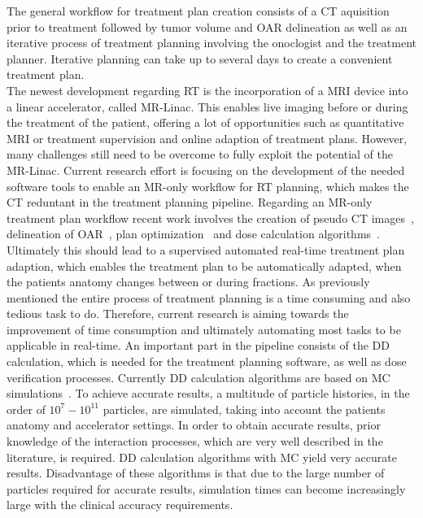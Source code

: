The general workflow for treatment plan creation consists of a \ac{CT} aquisition prior to treatment followed by tumor volume and \acs{OAR} delineation as well as an iterative process of treatment planning involving the onoclogist and the treatment planner. 
Iterative planning can take up to several days to create a convenient treatment plan.\\
The newest development regarding \ac{RT} is the incorporation of a \ac{MRI} device into a linear accelerator, called MR-Linac. 
This enables live imaging before or during the treatment of the patient, offering a lot of opportunities such as quantitative \acs{MRI} or treatment supervision and online adaption of treatment plans. 
However, many challenges still need to be overcome to fully exploit the potential of the MR-Linac.
Current research effort is focusing on the development of the needed software tools to enable an MR-only workflow for \acs{RT} planning, which makes the \acs{CT} reduntant in the treatment planning pipeline. 
Regarding an MR-only treatment plan workflow recent work involves the creation of pseudo CT images~\cite{han_mr-based_2017, wolterink_deep_2017, dinkla_mr-only_2018}, delineation of \acs{OAR}~\cite{kazemifar_segmentation_2018, liang_deep-learning-based_2019, shen_medical_2019}, plan optimization~\cite{fan_automatic_2019, liu_deep_2019} and dose calculation algorithms~\cite{javaid_mitigating_2019}.
Ultimately this should lead to a supervised automated real-time treatment plan adaption, which enables the treatment plan to be automatically adapted, when the patients anatomy changes between or during fractions.
As previously mentioned the entire process of treatment planning is a time consuming and also tedious task to do. 
Therefore, current research is aiming towards the improvement of time consumption and ultimately automating most tasks to be applicable in real-time.
An important part in the pipeline consists of the \ac{DD} calculation, which is needed for the treatment planning software, as well as dose verification processes.
Currently \acs{DD} calculation algorithms are based on \ac{MC} simulations~\cite{jabbari_review_2011}. 
To achieve accurate results, a multitude of particle histories, in the order of $10^7 - 10^{11}$ particles, are simulated, taking into account the patients anatomy and accelerator settings.
In order to obtain accurate results, prior knowledge of the interaction processes, which are very well described in the literature, is required.
\acs{DD} calculation algorithms with \acs{MC} yield very accurate results. 
Disadvantage of these algorithms is that due to the large number of particles required for accurate results, simulation times can become increasingly large with the clinical accuracy requirements.

